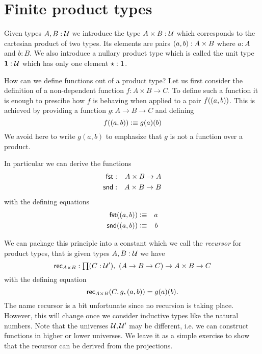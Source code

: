 


\section{Finite product types}
\label{sec:finite-product-types}

Given types $A,B:\mathcal{U}$ we introduce the type $A\times B:\mathcal{U}$ which
corresponds to the cartesian product of two types. Its elements are
pairs $( a,b) : A \times B$ where $a:A$ and $b:B$. We also
introduce a nullary product type which is called the unit type $\mathbf{1}
: \mathcal{U}$ which has only one element $\star : \mathbf{1}$.

How can we define functions out of a product type? Let us first
consider the definition of a non-dependent function $f : A\times B \to
C$. To define such a function it is enough to prescibe how $f$ is
behaving when applied to a pair $f(( a,b))$. This is achieved by
providing a function $g : A \to B \to C$ and defining
\[ f(( a,b)) \vcentcolon\equiv g(a)(b) \]
We avoid here to write $g(a,b)$ to emphasize that $g$ is not a
function over a product. 

In particular we can derive the functions
\begin{eqnarray*}
  \mathsf{fst} & : & A \times B \to A \\
  \mathsf{snd} & : & A \times B \to B
\end{eqnarray*}
with the defining equations 
\begin{eqnarray*}
  \mathsf{fst}(( a,b)) & \vcentcolon\equiv & a \\
  \mathsf{snd}(( a,b)) & \vcentcolon\equiv & b
\end{eqnarray*}

We can package this principle into a constant which we call the
\emph{recursor} for product
types, that is given types $A,B : \mathcal{U}$ we have
\[\rec{A\times B} : \prd{C:\UU'}(A \to B \to C) \to A \times B \to C\]
with the defining equation
\[\mathsf{rec}_{A\times B}(C,g,( a,b)) = g(a)(b). \]
The name recursor is a bit unfortunate since no recursion is taking
place. However, this will change once we consider inductive types like
the natural numbers.
Note that the universes $\mathcal{U},\mathcal{U}'$ may be different, i.e. we can
construct functions in higher or lower universes. 
We leave it as a simple exercise to show that the recursor can be
derived from the projections.


